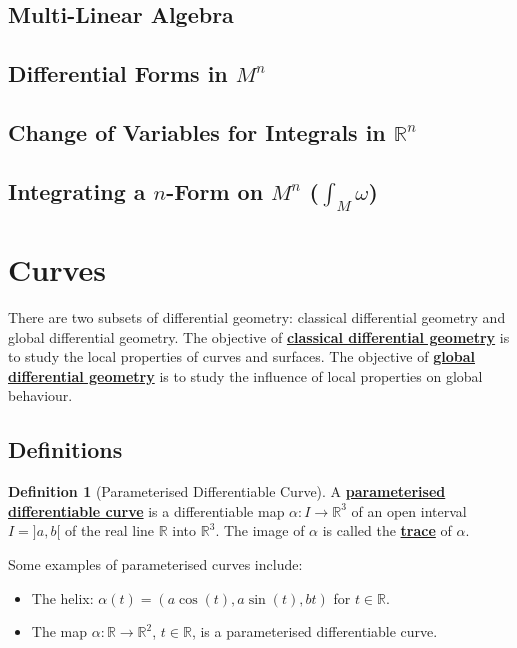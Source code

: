 \documentclass[11pt]{scrartcl}
\newcommand{\R}[0]{\mathbb{R}}
\theoremstyle{definition}
\newtheorem{definition}{Definition}
\theoremstyle{remark}
\newcommand{\dfn}[1]{\textbf{\underline{#1}}}
\newcommand{\idx}[2]{\int_{#1}^{#2}}
\begin{document}
{\subsection{Multi-Linear Algebra}

\subsection{Differential Forms in $M^n$}

\subsection{Change of Variables for Integrals in $\R^n$}

\subsection{Integrating a $n$-Form on $M^n$ ($\idx{M}{} \omega$)} 

\section{Curves}
There are two subsets of differential geometry: classical differential geometry and global differential geometry. The objective of \dfn{classical differential geometry} is to study the local properties of curves and surfaces. The objective of \dfn{global differential geometry} is to study the influence of local properties on global behaviour. 
\subsection{Definitions}

\begin{definition}[Parameterised Differentiable Curve] 
	A \dfn{parameterised differentiable curve} is a differentiable map $ \alpha: I \rightarrow \R^3$ of an open interval $I = ]a,b[$ of the real line $\R$ into $\R^3$. The image of $\alpha$ is called the \dfn{trace} of $\alpha$. 
\end{definition}

Some examples of parameterised curves include: 
\begin{itemize}[noitemsep]
	\item The helix: $\alpha(t) = (a \cos (t), a \sin(t), bt)$ for $t \in \R$. 
	\item The map $\alpha: \R \rightarrow \R^2$, $t \in \R$, is a parameterised differentiable curve. 
\end{itemize}

}
\end{document}
